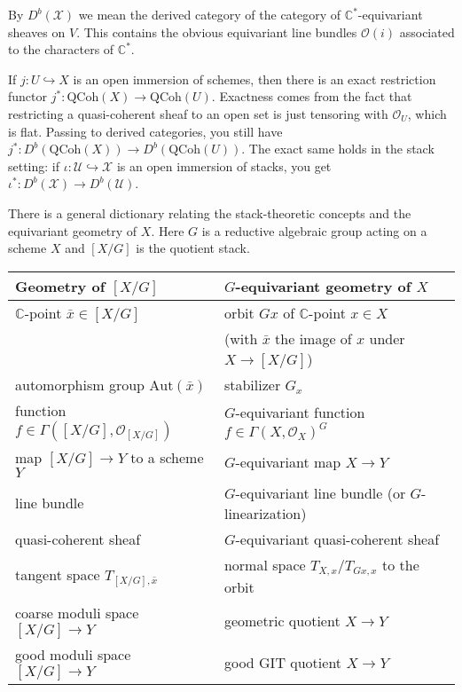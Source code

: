 \documentclass[12pt]{article}
\begin{document}
By $D^b(\mathcal{X})$ we mean the derived category of the category of $\mathbb{C}^*$-equivariant sheaves on $V$. This contains the obvious equivariant line bundles $\mathcal{O}(i)$ associated to the characters of $\mathbb{C}^*$.

\begin{remark}
If $j: U \hookrightarrow X$ is an open immersion of schemes, then there is an exact restriction functor $j^*: \mathrm{QCoh}(X) \to \mathrm{QCoh}(U)$. Exactness comes from the fact that restricting a quasi-coherent sheaf to an open set is just tensoring with $\mathcal{O}_U$, which is flat. Passing to derived categories, you still have $j^*: D^b(\mathrm{QCoh}(X)) \to D^b(\mathrm{QCoh}(U))$. The exact same holds in the stack setting: if $\iota: \mathcal{U} \hookrightarrow \mathcal{X}$ is an open immersion of stacks, you get $\iota^*: D^b(\mathcal{X}) \to D^b(\mathcal{U})$.
\end{remark}

\begin{remark}
There is a general dictionary relating the stack-theoretic concepts and the equivariant geometry of $X$. Here $G$ is a reductive algebraic group acting on a scheme $X$ and $[X/G]$ is the quotient stack.
\begin{center}
    \begin{tabular}{|l|l|}
    \hline
    \textbf{Geometry of $[X/G]$} & \textbf{$G$-equivariant geometry of $X$} \\[1ex]
    \hline
    $\mathbb{C}$-point $\bar{x} \in [X/G]$ 
      & orbit $Gx$ of $\mathbb{C}$-point $x \in X$ \\
      & (with $\bar{x}$ the image of $x$ under $X \to [X/G]$) \\[1ex]
    \hline
    automorphism group $\mathrm{Aut}(\bar{x})$ 
      & stabilizer $G_x$ \\[1ex]
    \hline
    function $f \in \Gamma([X/G],\mathcal{O}_{[X/G]})$ 
      & $G$-equivariant function $f \in \Gamma(X,\mathcal{O}_X)^G$ \\[1ex]
    \hline
    map $[X/G] \to Y$ to a scheme $Y$ 
      & $G$-equivariant map $X \to Y$ \\[1ex]
    \hline
    line bundle 
      & $G$-equivariant line bundle (or $G$-linearization) \\[1ex]
    \hline
    quasi-coherent sheaf 
      & $G$-equivariant quasi-coherent sheaf \\[1ex]
    \hline
    tangent space $T_{[X/G],\bar{x}}$ 
      & normal space $T_{X,x}/T_{Gx,x}$ to the orbit \\[1ex]
    \hline
    coarse moduli space $[X/G] \to Y$ 
      & geometric quotient $X \to Y$ \\[1ex]
    \hline
    good moduli space $[X/G] \to Y$ 
      & good GIT quotient $X \to Y$ \\[1ex]
    \hline
    \end{tabular}
\end{center}
\end{remark}
\end{document}
